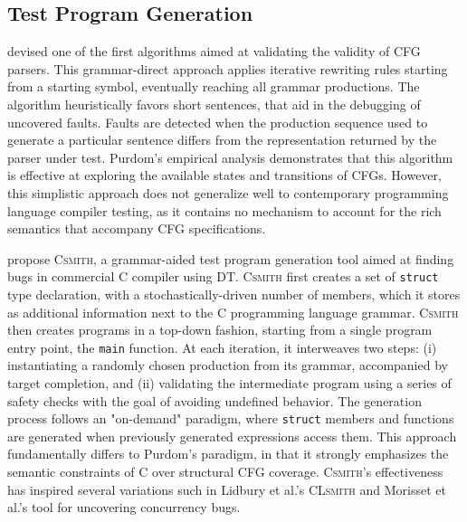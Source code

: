 \subsection{\label{subsec:tpg}Test Program Generation}

\citet{purdom1972sentence} devised one of the first algorithms aimed at
validating the validity of \gls{CFG} parsers.
This grammar-direct approach applies iterative rewriting rules
starting from a starting symbol, eventually reaching all grammar productions.
The algorithm heuristically favors short sentences, that aid in the
debugging of uncovered faults.
Faults are detected when the production sequence used to generate a particular
sentence differs from the representation returned by the parser under test.
Purdom's \cite{purdom1972sentence} empirical analysis demonstrates
that this algorithm is effective at exploring the available
states and transitions of \gls{CFG}s.
However, this simplistic approach does not generalize
well to contemporary programming language compiler testing,
as it contains no mechanism to account for the rich semantics
that accompany \gls{CFG} specifications.

\citet{yang2011finding} propose \textsc{Csmith}, a grammar-aided
test program generation tool aimed at finding bugs in commercial 
C compiler using \gls{DT}.
\textsc{Csmith} first creates a set of \texttt{struct} type
declaration, with a stochastically-driven  number of members, which 
it stores as additional information next to the C programming language grammar.
\textsc{Csmith} then creates programs in a top-down fashion, starting from a
single program entry point, the \texttt{main} function.
At each iteration, it interweaves two steps: (i) instantiating
a randomly chosen production from its grammar, accompanied
by target completion, and (ii) validating the intermediate program
using a series of safety checks with the goal of avoiding undefined behavior.
The generation process follows an "on-demand" paradigm, where \texttt{struct}
members and functions are generated when previously generated expressions
access them.
This approach fundamentally differs to Purdom's \cite{purdom1972sentence} paradigm,
in that it strongly emphasizes the semantic constraints of C over 
structural \gls{CFG} coverage.
\textsc{Csmith}'s effectiveness has inspired several variations such in
Lidbury et al.'s \textsc{CLsmith} \cite{lidbury2015many} and
Morisset et al.'s \cite{morisset2013compiler} tool for uncovering
concurrency bugs.

